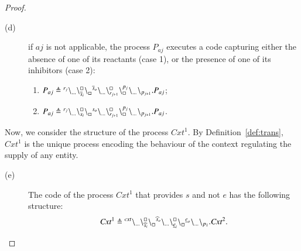 \begin{proof}
\begin{description}
\item[(d)] 
 if $aj$ is not applicable,
the process $P_{aj}$ executes a code  capturing either the absence of one of its reactants (case 1), or the presence  of one of its inhibitors (case 2):
\begin{enumerate}
\item $P_{aj}\triangleq {}^{r_j} \backslash_{\dots}\backslash_{\overline{s}_i}^{\scriptstyle {\square}}\backslash_{\scriptstyle {\square}}^{}{}^{\overline{s}_o} \backslash_{\dots} \backslash_{r_{j+1}}^{\scriptstyle {\square}}\backslash_{\scriptstyle {\square}}^{p_j}{}^{} \backslash_{\dots}{}^{} \backslash_{p_{j+1}}.P_{aj} $;
\item $P_{aj}\triangleq {}^{r_j} \backslash_{\dots}\backslash_{s_i}^{\scriptstyle {\square}}\backslash_{\scriptstyle {\square}}^{}{}^{s_o} \backslash_{\dots} \backslash_{r_{j+1}}^{\scriptstyle {\square}}\backslash_{\scriptstyle {\square}}^{p_j}{}^{} \backslash_{\dots}{}^{} \backslash_{p_{j+1}} .P_{aj}$.
\end{enumerate}
\end{description}
Now, we consider the structure of the process $\mathit{Cxt}^1$. 
By Definition~\ref{def:trans}, $Cxt^1$ is the unique process encoding the behaviour of the context regulating the supply of any entity. 

\begin{description}
\item[(e)] 
The code of the process $Cxt^1$ that provides $s$ and not $e$ has the following structure: 
$$
\mathit{Cxt}^1 \triangleq
{}^{\mathit{cxt}} \backslash_{\dots}
\backslash_{\widehat{s}_i}^{\scriptstyle {\square}}\backslash_{\scriptstyle {\square}}^{}{}^{\widehat{s}_o} \backslash_{\dots} 
\backslash_{\underline{e}_i}^{\scriptstyle {\square}}\backslash_{\scriptstyle {\square}}^{}{}^{\underline{e}_o} \backslash_{\dots} 
\backslash_{p_{1}}. \mathit{Cxt}^{2} .
$$
\end{description}



\end{proof}
